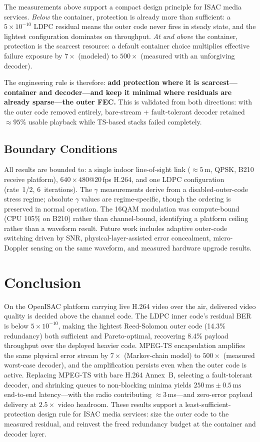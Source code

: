 \documentclass[conference]{IEEEtran}
\begin{document}
The measurements above support a compact design principle for ISAC media services. \emph{Below} the container, protection is already more than sufficient: a $5\times10^{-10}$ LDPC residual means the outer code never fires in steady state, and the lightest configuration dominates on throughput. \emph{At and above} the container, protection is the scarcest resource: a default container choice multiplies effective failure exposure by $7\times$ (modeled) to $500\times$ (measured with an unforgiving decoder).

The engineering rule is therefore: \textbf{add protection where it is scarcest---container and decoder---and keep it minimal where residuals are already sparse---the outer FEC.} This is validated from both directions: with the outer code removed entirely, bare-stream + fault-tolerant decoder retained $\approx\!95\%$ usable playback while TS-based stacks failed completely.

\subsection{Boundary Conditions}

All results are bounded to: a single indoor line-of-sight link ($\approx\!5$\,m, QPSK, B210 receive platform), $640\times480$@20\,fps H.264, and one LDPC configuration (rate~1/2, 6~iterations). The $\gamma$ measurements derive from a disabled-outer-code stress regime; absolute $\gamma$ values are regime-specific, though the ordering is preserved in normal operation. The 16QAM modulation was compute-bound (CPU 105\% on B210) rather than channel-bound, identifying a platform ceiling rather than a waveform result. Future work includes adaptive outer-code switching driven by SNR, physical-layer-assisted error concealment, micro-Doppler sensing on the same waveform, and measured hardware upgrade results.

\section{Conclusion}
\label{sec:conclusion}

On the OpenISAC platform carrying live H.264 video over the air, delivered video quality is decided above the channel code. The LDPC inner code's residual BER is below $5\times10^{-10}$, making the lightest Reed-Solomon outer code (14.3\% redundancy) both sufficient and Pareto-optimal, recovering 8.4\% payload throughput over the deployed heavier code. MPEG-TS encapsulation amplifies the same physical error stream by $7\times$ (Markov-chain model) to $500\times$ (measured worst-case decoder), and the amplification persists even when the outer code is active. Replacing MPEG-TS with bare H.264 Annex~B, selecting a fault-tolerant decoder, and shrinking queues to non-blocking minima yields $250\,\text{ms} \pm 0.5\,\text{ms}$ end-to-end latency---with the radio contributing $\approx\!3$\,ms---and zero-error payload delivery at $2.5\times$ video headroom. These results support a least-sufficient-protection design rule for ISAC media services: size the outer code to the measured residual, and reinvest the freed redundancy budget at the container and decoder layer.
\end{document}
